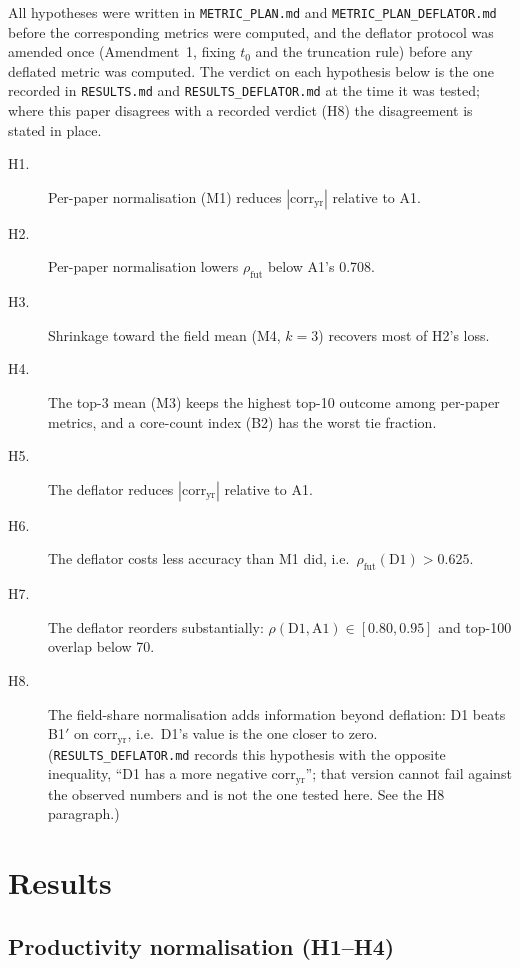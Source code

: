 \documentclass{article}
\begin{document}
All hypotheses were written in \texttt{METRIC\_PLAN.md} and \texttt{METRIC\_PLAN\_DEFLATOR.md}
before the corresponding metrics were computed, and the deflator protocol was amended once
(Amendment~1, fixing $t_0$ and the truncation rule) before any deflated metric was computed. The
verdict on each hypothesis below is the one recorded in \texttt{RESULTS.md} and
\texttt{RESULTS\_DEFLATOR.md} at the time it was tested; where this paper disagrees with a
recorded verdict (H8) the disagreement is stated in place.
\begin{description}
  \item[H1.] Per-paper normalisation (M1) reduces $|\text{corr}_{\text{yr}}|$ relative to A1.
  \item[H2.] Per-paper normalisation lowers $\rho_{\text{fut}}$ below A1's 0.708.
  \item[H3.] Shrinkage toward the field mean (M4, $k=3$) recovers most of H2's loss.
  \item[H4.] The top-3 mean (M3) keeps the highest top-10 outcome among per-paper metrics, and a
    core-count index (B2) has the worst tie fraction.
  \item[H5.] The deflator reduces $|\text{corr}_{\text{yr}}|$ relative to A1.
  \item[H6.] The deflator costs less accuracy than M1 did, i.e.\ $\rho_{\text{fut}}(\text{D1}) >
    0.625$.
  \item[H7.] The deflator reorders substantially: $\rho(\text{D1}, \text{A1}) \in [0.80, 0.95]$
    and top-100 overlap below 70.
  \item[H8.] The field-share normalisation adds information beyond deflation: D1 beats B1$'$ on
    $\text{corr}_{\text{yr}}$, i.e.\ D1's value is the one closer to zero. (\texttt{RESULTS\_DEFLATOR.md}
    records this hypothesis with the opposite inequality, ``D1 has a more negative
    $\text{corr}_{\text{yr}}$''; that version cannot fail against the observed numbers and is not
    the one tested here. See the H8 paragraph.)
\end{description}

\section{Results}

\subsection{Productivity normalisation (H1--H4)}
\end{document}
